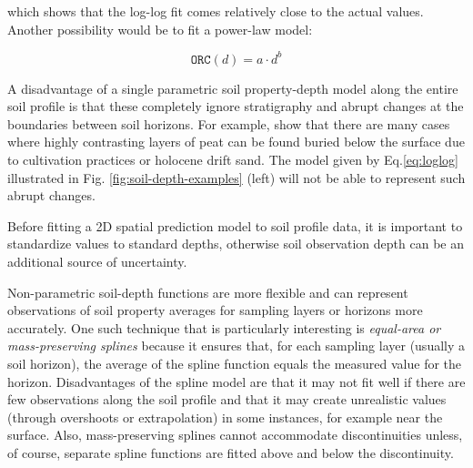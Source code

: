 \documentclass[11pt]{krantz}
\makeatletter
\newenvironment{kframe}{%
\medskip{}
\setlength{\fboxsep}{.8em}
 \def\at@end@of@kframe{}%
 \ifinner\ifhmode%
  \def\at@end@of@kframe{\end{minipage}}%
  \begin{minipage}{\columnwidth}%
 \fi\fi%
 \def\FrameCommand##1{\hskip\@totalleftmargin \hskip-\fboxsep
 \colorbox{shadecolor}{##1}\hskip-\fboxsep
     \hskip-\linewidth \hskip-\@totalleftmargin \hskip\columnwidth}%
 \MakeFramed {\advance\hsize-\width
   \@totalleftmargin\z@ \linewidth\hsize
   \@setminipage}}%
 {\par\unskip\endMakeFramed%
 \at@end@of@kframe}
\newenvironment{rmdblock}[1]
  {
  \begin{itemize}
  \renewcommand{\labelitemi}{
    \raisebox{-.7\height}[0pt][0pt]{
      {\setkeys{Gin}{width=3em,keepaspectratio}\texttt{[image: images/\#1]}}
    }
  }
  \setlength{\fboxsep}{1em}
  \begin{kframe}
  \item
  }
  {
  \end{kframe}
  \end{itemize}
  }
\newenvironment{rmdnote}
  {\begin{rmdblock}{note}}
  {\end{rmdblock}}
\theoremstyle{definition}
\theoremstyle{definition}
\theoremstyle{definition}
\theoremstyle{remark}
\makeatother
\begin{document}
which shows that the log-log fit comes relatively close to the actual
values. Another possibility would be to fit a power-law model:

\begin{equation}
{\texttt{ORC}} (d) = a \cdot d^b
\label{eq:loglog}
\end{equation}

A disadvantage of a single parametric soil property-depth model along
the entire soil profile is that these completely ignore stratigraphy and
abrupt changes at the boundaries between soil horizons. For example,
\citet{Kempen2011Geoderma} show that there are many cases where highly
contrasting layers of peat can be found buried below the surface due to
cultivation practices or holocene drift sand. The model given by
Eq.\eqref{eq:loglog} illustrated in Fig. \ref{fig:soil-depth-examples}
(left) will not be able to represent such abrupt changes.

\begin{rmdnote}
Before fitting a 2D spatial prediction model to soil profile data, it is
important to standardize values to standard depths, otherwise soil
observation depth can be an additional source of uncertainty.
\end{rmdnote}

Non-parametric soil-depth functions are more flexible and can represent
observations of soil property averages for sampling layers or horizons
more accurately. One such technique that is particularly interesting is
\emph{equal-area or mass-preserving splines}
\citep{Bishop1999Geoderma, Malone2009Geoderma} because it ensures that,
for each sampling layer (usually a soil horizon), the average of the
spline function equals the measured value for the horizon. Disadvantages
of the spline model are that it may not fit well if there are few
observations along the soil profile and that it may create unrealistic
values (through overshoots or extrapolation) in some instances, for
example near the surface. Also, mass-preserving splines cannot
accommodate discontinuities unless, of course, separate spline functions
are fitted above and below the discontinuity.
\end{document}
